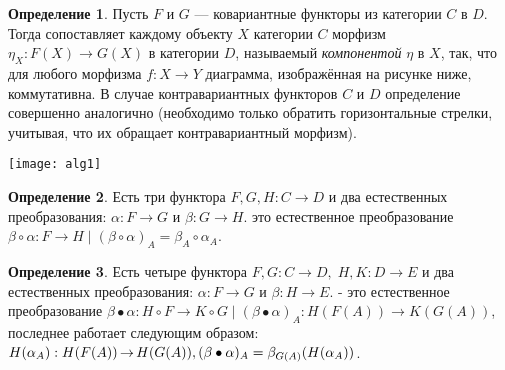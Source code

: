 \documentclass[a4paper]{article}
\theoremstyle{indented}
\theoremstyle{definition}
\newtheorem{defn}{Определение}
\theoremstyle{remark}
\DeclareMathOperator{\ra}{\rightarrow}
\begin{document}
\begin{defn}

    Пусть $F$ и $G$ — ковариантные функторы из категории $C$ в $D$. Тогда  сопоставляет каждому объекту $X$ категории $C$ морфизм $\eta_X\colon F(X) \to G(X)$ в категории $D$, называемый \textit{компонентой} $\eta$ в $X$, так, что для любого морфизма $f\colon X \to Y$ диаграмма, изображённая на рисунке ниже, коммутативна. В случае контравариантных функторов $C$ и $D$ определение совершенно аналогично (необходимо только обратить горизонтальные стрелки, учитывая, что их обращает контравариантный морфизм).

\begin{center}
    \texttt{[image: alg1]}
\end{center}

\end{defn}

\begin{defn}
    Есть три функтора $F, G, H: C \ra D$ и два естественных преобразования: $\alpha: F \ra G$ и $\beta: G \ra H$.   это естественное преобразование $\beta \circ \alpha : F \ra H\;|\;(\beta \circ \alpha)_A = \beta_A \circ \alpha_A$. 
\end{defn}

\begin{defn}
    Есть четыре функтора $F, G: C \ra D, \;H, K: D \ra E$ и два естественных преобразования: $\alpha: F \ra G$ и $\beta: H \ra E$.  - это естественное преобразование $\beta \bullet \alpha: H \circ F \ra K \circ G\;|\;(\beta \bullet \alpha)_A : H(F(A)) \ra K(G(A))$, последнее работает следующим образом: $H(\alpha_A): H(F(A)) \ra H(G(A)), \break (\beta \bullet \alpha)_A = \beta_{G(A)}(H(\alpha_A))$.
\end{defn}
\end{document}
